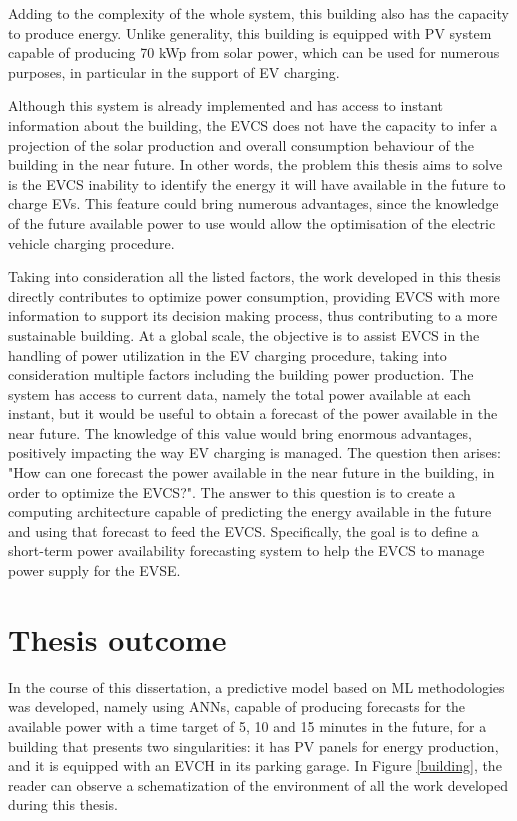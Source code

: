 Adding to the complexity of the whole system, this building also has the capacity to produce energy. Unlike generality, this building is equipped with \ac{PV} system capable of producing 70 kWp from solar power, which can be used for numerous purposes, in particular in the support of \ac{EV} charging.


Although this system is already implemented and has access to instant information about the building, the \ac{EVCS} does not have the capacity to infer a projection of the solar production and overall consumption behaviour of the building in the near future. In other words, the problem this thesis aims to solve is the \ac{EVCS} inability to identify the energy it will have available in the future to charge \ac{EV}s. This feature could bring numerous advantages, since the knowledge of the future available power to use would allow the optimisation of the electric vehicle charging procedure.


Taking into consideration all the listed factors, the work developed in this thesis directly contributes to optimize power consumption, providing \ac{EVCS} with more information to support its decision making process, thus contributing to a more sustainable building. At a global scale, the objective is to assist \ac{EVCS} in the handling of power utilization in the \ac{EV} charging procedure, taking into consideration multiple factors including the building power production. The system has access to current data, namely the total power available at each instant, but it would be useful to obtain a forecast of the power available in the near future. The knowledge of this value would bring enormous advantages, positively impacting the way \ac{EV} charging is managed. The question then arises: "How can one forecast the power available in the near future in the building, in order to optimize the \ac{EVCS}?". The answer to this question is to create a computing architecture capable of predicting the energy available in the future and using that forecast to feed the \ac{EVCS}. Specifically, the goal is to define a short-term power availability forecasting system to help the \ac{EVCS} to manage power supply for the \ac{EVSE}. 





\section{Thesis outcome}

In the course of this dissertation, a predictive model based on \ac{ML} methodologies was developed, namely using \ac{ANNs}, capable of producing forecasts for the available power with a time target of 5, 10 and 15 minutes in the future, for a building that presents two singularities: it has \acf{PV} panels for energy production, and it is equipped with an \ac{EVCH} in its parking garage. In Figure \ref{building}, the reader can observe a schematization of the environment of all the work developed during this thesis. 

